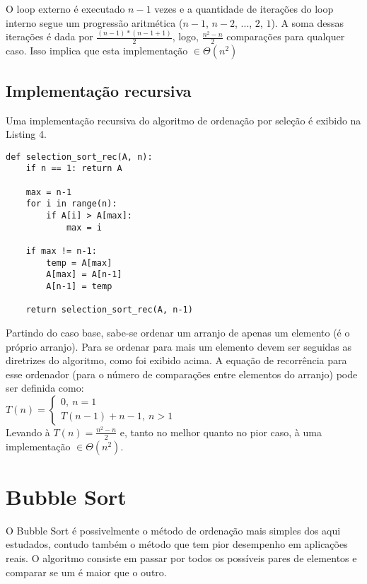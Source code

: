\documentclass[a4paper, twocolumn]{article}
\theoremstyle{definition}
\begin{document}
O loop externo é executado $n-1$ vezes e a quantidade de iterações do loop interno segue um progressão aritmética ($n-1$, $n-2$, ..., $2$, $1$). A soma dessas iterações é dada por $\frac{(n-1)*(n-1+1)}{2}$, logo, $\frac{n^2-n}{2}$ comparações para qualquer caso. Isso implica que esta implementação $\in \Theta(n^2)$

\subsection{Implementação recursiva}

Uma implementação recursiva do algoritmo de ordenação por seleção é exibido na Listing 4.

\begin{lstlisting}[label=selection_sort_rec,caption= Selection Sort recursivo]
def selection_sort_rec(A, n):
    if n == 1: return A
    
    max = n-1
    for i in range(n):
        if A[i] > A[max]:
            max = i
    
    if max != n-1:
        temp = A[max]
        A[max] = A[n-1]
        A[n-1] = temp

    return selection_sort_rec(A, n-1)
\end{lstlisting}

Partindo do caso base, sabe-se ordenar um arranjo de apenas um elemento (é o próprio arranjo). Para se ordenar para mais um elemento devem ser seguidas as diretrizes do algoritmo, como foi exibido acima. A equação de recorrência para esse ordenador (para o número de comparações entre elementos do arranjo) pode ser definida como: \\

$T(n) = \begin{cases} 
	0, \ n = 1\\
	T(n-1) + n-1, \ n > 1
\end{cases}$ \\

Levando à $T(n) = \frac{n^2-n}{2}$ e, tanto no melhor quanto no pior caso, à uma implementação $\in \Theta(n^2)$.

\section{Bubble Sort}

O Bubble Sort é possivelmente o método de ordenação mais simples dos aqui estudados, contudo também o método que tem pior desempenho em aplicações reais. O algoritmo consiste em passar por todos os possíveis pares de elementos e comparar se um é maior que o outro. 
\end{document}
